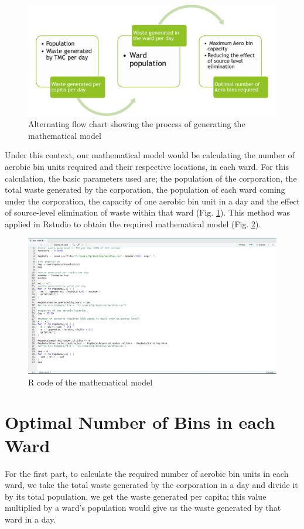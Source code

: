 \documentclass[12pt,a4paper]{report}
\begin{document}
\begin{figure}[H]
	\centering
	\includegraphics[width=0.8\linewidth]{mathmod}
	\caption{Alternating flow chart showing the process of generating the mathematical model}
	\label{fig:mathmod}
\end{figure}

Under this context, our mathematical model would be calculating the number of aerobic bin units required and their respective locations, in each ward. For this calculation, the basic parameters used are; the population of the corporation, the total waste generated by the corporation, the population of each ward coming under the corporation, the capacity of one aerobic bin unit in a day and the effect of source-level elimination of waste within that ward (Fig. \ref{fig:mathmod}). This method was applied in Rstudio to obtain the required mathematical model (Fig. \ref{fig:rcode}). 

\begin{figure}[H]
	\centering
	\includegraphics[width=1\linewidth]{Rcode}
	\caption{R code of the mathematical model}
	\label{fig:rcode}
\end{figure}

\section{Optimal Number of Bins in each Ward}
For the first part, to calculate the required number of aerobic bin units in each ward, we take the total waste generated by the corporation in a day and divide it by its total population, we get the waste generated per capita; this value multiplied by a ward’s population would give us the waste generated by that ward in a day. 
\end{document}
